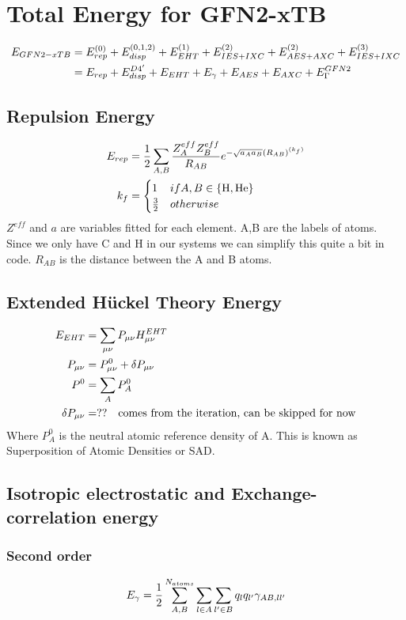 \section{Total Energy for GFN2-xTB}
\begin{equation}
\begin{split}
\E{GFN2-xTB} &= \E[0]{rep}+\E[0,1,2]{disp}+\E[1]{EHT}+\E[2]{IES+IXC}+\E[2]{AES+AXC}+\E[3]{IES+IXC}\\
&=\E{rep}+\E{disp}^{D4'}+\E{EHT}+\E{\gamma}+\E{AES}+\E{AXC}+\E{\Gamma}^{GFN2}
\end{split}
\end{equation}
\subsection{Repulsion Energy}
\begin{align}
\E{rep} &= \frac{1}{2}\sum_{A,B}\frac{Z^{eff}_A Z^{eff}_B}{R_{AB}}e^{-\sqrt{a_Aa_B}(R_{AB})^{(k_f)}}\\
k_f &= \begin{cases}1 & if A,B\in\{\text{H},\text{He}\}\\\frac{3}{2}&otherwise\end{cases} 
\end{align}
$Z^{eff}$ and $a$ are variables fitted for each element. A,B are the labels of atoms. 
Since we only have C and H in our systems we can simplify this quite a bit in code. 
$R_{AB}$ is the distance between the A and B atoms.
\subsection{Extended Hückel Theory Energy}
\begin{align}
    \E{EHT} &= \sum_{\mu\nu}P_{\mu\nu}H^{EHT}_{\mu\nu}\\
    P_{\mu\nu} &= P^0_{\mu\nu}+ \delta P_{\mu\nu}\\
    P^0&=\sum_AP_A^0\\ 
    \delta P_{\mu\nu} &=??\quad\text{comes from the iteration, can be skipped for now}
\end{align}
Where $P_A^0$ is the neutral atomic reference density of A. This is known as Superposition of Atomic Densities or SAD.  
\subsection{Isotropic electrostatic and Exchange-correlation energy}
\subsubsection{Second order}
\begin{equation}
    \E{\gamma} = \frac{1}{2}\sum_{A,B}^{N_{atoms}}\sum_{l\in A}\sum_{l'\in B}q_lq_{l'}\gamma_{AB,ll'}
\end{equation}
